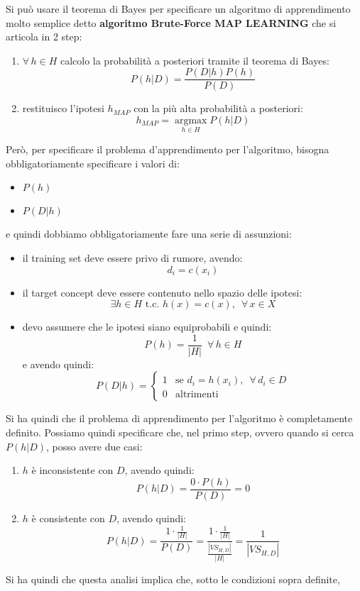 Si può usare il teorema di Bayes per specificare un algoritmo di apprendimento
molto semplice detto \textbf{algoritmo Brute-Force MAP LEARNING} che si articola
in 2 step:
\begin{enumerate}
  \item $\forall\,h\in H$ calcolo la probabilità a posteriori tramite il teorema
  di Bayes:
  \[P(h|D)=\frac{P(D|h)P(h)}{P(D)}\]
  
  \item restituisco l'ipotesi $h_{MAP}$ con la più alta probabilità a
  posteriori:
  \[h_{MAP}=\operatorname*{argmax}_{h\in H}P(h|D)\]
\end{enumerate}
Però, per specificare il problema d'apprendimento per l'algoritmo, bisogna
obbligatoriamente specificare i valori di:
\begin{itemize}
  \item $P(h)$
  \item $P(D|h)$
\end{itemize}
e quindi dobbiamo obbligatoriamente fare una serie di assunzioni:
\begin{itemize}
  \item il training set deve essere privo di rumore, avendo:
  \[d_i=c(x_i)\]
  \item il target concept deve essere contenuto nello spazio delle ipotesi:
  \[\exists h\in H \mbox{ t.c. }h(x)=c(x),\,\,\,\forall\, x\in X\]
  \item devo assumere che le ipotesi siano equiprobabili e quindi:
  \[P(h)=\frac{1}{|H|}\,\,\,\forall\,h\in H\]
  e avendo quindi:
  \[P(D|h)=
    \begin{cases}
      1&\mbox{se } d_i=h(x_i),\,\,\,\forall\,d_i\in D\\
      0&\mbox{altrimenti}
    \end{cases}
  \]
\end{itemize}
Si ha quindi che il problema di apprendimento per l'algoritmo è completamente
definito. Possiamo quindi specificare che, nel primo step, ovvero quando si
cerca $P(h|D)$, posso avere due casi:
\begin{enumerate}
  \item $h$ è inconsistente con $D$, avendo quindi:
  \[P(h|D)=\frac{0\cdot P(h)}{P(D)}=0\]
  \item $h$ è consistente con $D$, avendo quindi:
  \[P(h|D)=\frac{1\cdot \frac{1}{|H|}}{P(D)}=\frac{1\cdot
      \frac{1}{|H|}}{\frac{|VS_{H,D}|}{|H|}}=\frac{1}{|VS_{H,D}|}\] 
\end{enumerate}
Si ha quindi che questa analisi implica che, sotto le condizioni sopra definite,
